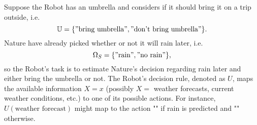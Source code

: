 \begin{example}
	\label{ex:rain}
	Suppose the Robot has an umbrella and considers if it should bring it on a trip outside, i.e.
	\begin{equation}
		\mathbb{U} = \{"\text{bring umbrella}", "\text{don't bring umbrella}"\}.
	\end{equation}
	Nature have already picked whether or not it will rain later, i.e.
	\begin{equation}
		\Omega_S = \{"\text{rain}", "\text{no rain}"\},
	\end{equation}
	so the Robot's task is to estimate Nature's decision regarding rain later and either bring the umbrella or not. The Robot's decision rule, denoted as $U$, maps the available information $X=x$ (possibly $X=$ weather forecasts, current weather conditions, etc.) to one of its possible actions. For instance, $U(\text{weather forecast})$ might map to the action "" if rain is predicted and "" otherwise.
\end{example}


